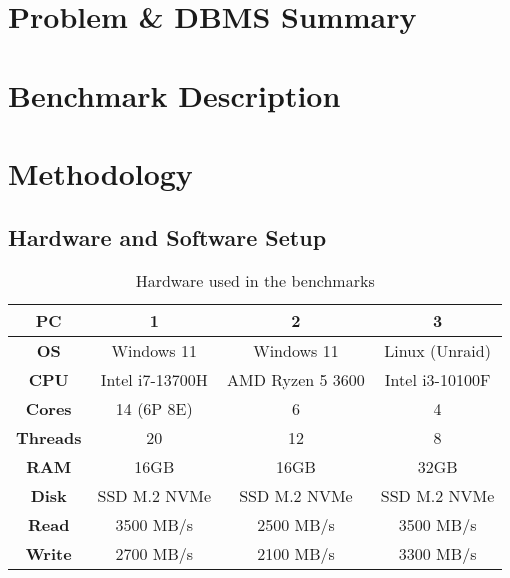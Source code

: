 \section{Problem \& DBMS Summary}
\label{sec:problem}

\section{Benchmark Description}
\label{sec:benchmark}

\section{Methodology}
\label{sec:methodology}

\pagebreak

\subsection{Hardware and Software Setup}
\label{sec:hardware-software-setup}

\begin{table}[h!]
    \centering
    \begin{tabular}{|c|c|c|c|}
        \hline
        \textbf{PC}      & \textbf{1}      & \textbf{2}       & \textbf{3}      \\
        \hline
        \textbf{OS}      & Windows 11      & Windows 11       & Linux (Unraid)  \\
        \hline
        \textbf{CPU}     & Intel i7-13700H & AMD Ryzen 5 3600 & Intel i3-10100F \\
        \hline
        \textbf{Cores}   & 14 (6P 8E)      & 6                & 4               \\
        \hline
        \textbf{Threads} & 20              & 12               & 8               \\
        \hline
        \textbf{RAM}     & 16GB            & 16GB             & 32GB            \\
        \hline
        \textbf{Disk}    & SSD M.2 NVMe    & SSD M.2 NVMe     & SSD M.2 NVMe    \\
        \hline
        \textbf{Read}    & 3500 MB/s       & 2500 MB/s        & 3500 MB/s       \\
        \hline
        \textbf{Write}   & 2700 MB/s       & 2100 MB/s        & 3300 MB/s       \\
        \hline
    \end{tabular}
    \caption{Hardware used in the benchmarks}
    \label{tab:hardware-setup}
\end{table}

